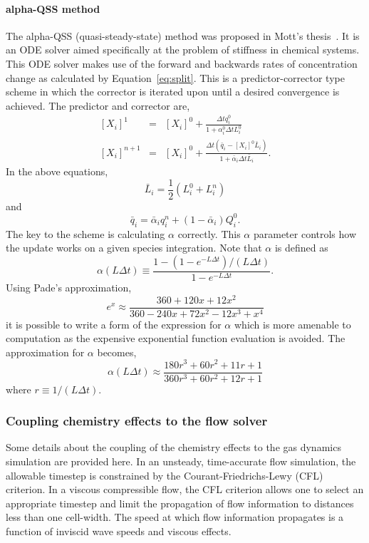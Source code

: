 \paragraph{alpha-QSS method}
%
The alpha-QSS (quasi-steady-state) method was proposed in Mott's thesis~\cite{mott_99}.
It is an ODE solver aimed specifically at the problem of stiffness in chemical
systems.
This ODE solver makes use of the forward and backwards rates of concentration change
as calculated by Equation~\ref{eq:split}.
This is a predictor-corrector type scheme in which the corrector is iterated
upon until a desired convergence is achieved.
The predictor and corrector are,
\begin{eqnarray}
\left[X_i\right]^1 & = & \left[X_i\right]^0 + \frac{ \Delta t q_i^0}{1 + \alpha_i^0 \Delta t L_i^0} \\
\left[X_i\right]^{n+1} & = & \left[X_i\right]^0 + \frac{ \Delta t \left(\bar{q}_i - \left[X_i\right]^0 \bar{L}_i \right)}{1 + \bar{\alpha}_i \Delta t \bar{L}_i }.
\end{eqnarray}
In the above equations,
\begin{equation}
\bar{L}_i = \frac{1}{2} \left( L_i^0 + L_i^n \right)
\end{equation}
and
\begin{equation}
\bar{q}_i = \bar{\alpha}_i q_i^n + \left( 1 - \bar{\alpha}_i\right) Q_i^0.
\end{equation}
The key to the scheme is calculating $\alpha$ correctly.
This $\alpha$ parameter controls how the update works on a given species integration.
Note that $\alpha$ is defined as
\begin{equation}
\alpha(L \Delta t) \equiv \frac{ 1 - \left( 1 - e^{-L \Delta t} \right) / (L \Delta t) }{1 - e^{-L \Delta t}}.
\end{equation}
Using Pade's approximation,
\begin{equation}
e^x \approx \frac{360 + 120x + 12x^2}{360 - 240x + 72x^2 - 12x^3 + x^4}
\end{equation}
it is possible to write a form of the expression for $\alpha$ which is more amenable to computation
as the expensive exponential function evaluation is avoided.
The approximation for $\alpha$ becomes,
\begin{equation}
\alpha(L \Delta t) \approx \frac{180 r^3 + 60 r^2 + 11 r + 1}{360 r^3 + 60 r^2 + 12 r + 1}
\end{equation}
where $r \equiv 1/(L \Delta t)$.

\subsubsection{Coupling chemistry effects to the flow solver}
Some details about the coupling of the chemistry effects to the gas dynamics
simulation are provided here.
In an unsteady, time-accurate flow simulation, the
allowable timestep is constrained by the Courant-Friedrichs-Lewy
(CFL) criterion.
In a viscous compressible flow, the CFL criterion allows one to
select an appropriate timestep and limit the propagation
of flow information to distances less than one cell-width.
The speed at which flow information propagates is a function
of inviscid wave speeds and viscous effects.


